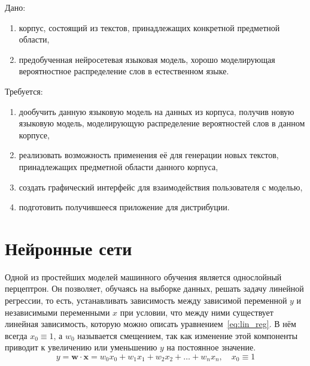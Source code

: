 Дано:
\begin{enumerate}
    \item корпус, состоящий из текстов, принадлежащих конкретной предметной области,
    \item предобученная нейросетевая языковая модель, хорошо моделирующая вероятностное распределение слов в естественном языке.
\end{enumerate}
Требуется:
\begin{enumerate}
    \item дообучить данную языковую модель на данных из корпуса, получив новую языковую модель, моделирующую распределение вероятностей слов в данном корпусе,
    \item реализовать возможность применения её для генерации новых текстов, принадлежащих предметной области данного корпуса,
    \item создать графический интерфейс для взаимодействия пользователя с моделью,
    \item подготовить получившееся приложение для дистрибуции.
\end{enumerate}

\section{Нейронные сети}

Одной из простейших моделей машинного обучения является однослойный перцептрон. Он позволяет, обучаясь на выборке данных, решать задачу линейной регрессии, то есть, устанавливать зависимость между зависимой переменной $y$ и независимыми переменными $x$ при условии, что между ними существует линейная зависимость, которую можно описать уравнением \ref*{eq:lin_reg}. В нём всегда $x_0\equiv 1$, а $w_0$ называется смещением, так как изменение этой компоненты приводит к увеличению или уменьшению $y$ на постоянное значение.
\begin{equation}
    \label{eq:lin_reg}
    y=\mathbf{w}\cdot\mathbf{x}=w_0x_0+w_1x_1+w_2x_2+\dots+w_nx_n,\quad x_0\equiv 1
\end{equation}

